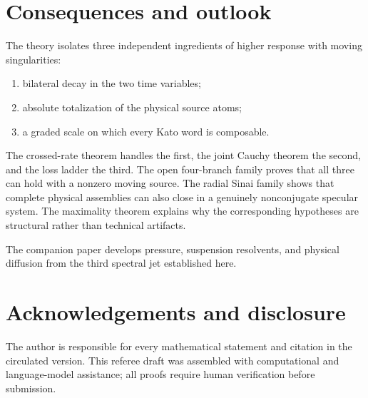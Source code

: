 \documentclass[11pt,reqno]{amsart}
\theoremstyle{definition}
\theoremstyle{remark}
\begin{document}
\section{Consequences and outlook}

The theory isolates three independent ingredients of higher response with
moving singularities:
\begin{enumerate}[label=\textup{(\arabic*)}]
\item bilateral decay in the two time variables;
\item absolute totalization of the physical source atoms;
\item a graded scale on which every Kato word is composable.
\end{enumerate}
The crossed-rate theorem handles the first, the joint Cauchy theorem the
second, and the loss ladder the third.  The open four-branch family proves that
all three can hold with a nonzero moving source.  The radial Sinai family shows
that complete physical assemblies can also close in a genuinely nonconjugate
specular system.  The maximality theorem explains why the corresponding
hypotheses are structural rather than technical artifacts.

The companion paper develops pressure, suspension resolvents, and physical
diffusion from the third spectral jet established here.

\section*{Acknowledgements and disclosure}
The author is responsible for every mathematical statement and citation in the
circulated version.  This referee draft was assembled with computational and
language-model assistance; all proofs require human verification before
submission.



\end{document}
